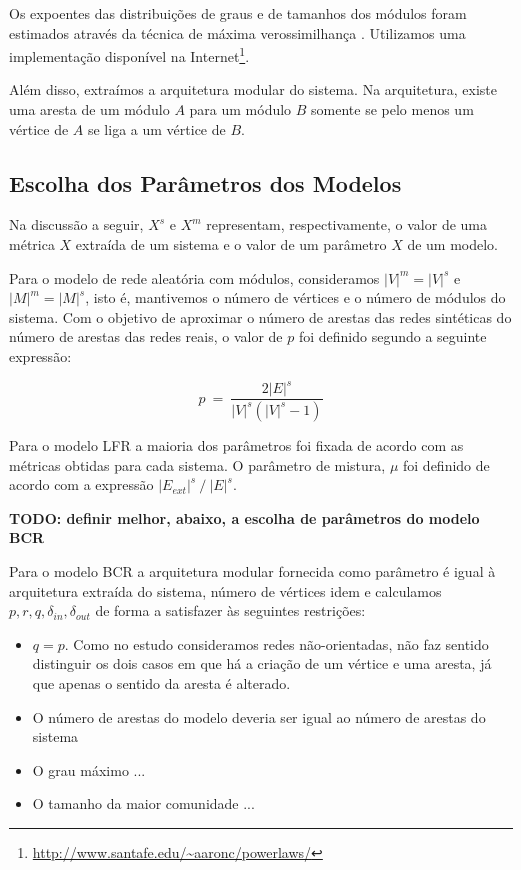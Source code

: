 \documentclass{acm_proc_article-sp}
\begin{document}
Os expoentes das distribuições de graus e de tamanhos dos módulos foram estimados através da técnica de máxima verossimilhança \cite{Clauset2007}. Utilizamos uma implementação disponível na Internet\footnote{\url{http://www.santafe.edu/~aaronc/powerlaws/}}.

Além disso, extraímos a arquitetura modular do sistema. Na arquitetura, existe uma aresta de um módulo $A$ para um módulo $B$ somente se pelo menos um vértice de $A$ se liga a um vértice de $B$.

\subsection{Escolha dos Parâmetros dos Modelos}

Na discussão a seguir, $X^s$ e $X^m$ representam, respectivamente, o valor de uma métrica $X$ extraída de um sistema e o valor de um parâmetro $X$ de um modelo.

Para o modelo de rede aleatória com módulos, consideramos $|V|^m = |V|^s$ e $|M|^m = |M|^s$, isto é,  mantivemos o número de vértices e o número de módulos do sistema. Com o objetivo de aproximar o número de arestas das redes sintéticas do número de arestas das redes reais, o valor de $p$ foi definido segundo a seguinte expressão:

\begin{equation}
p~=~\frac{2|E|^s}{|V|^s(|V|^s-1)}
\end{equation}

Para o modelo LFR a maioria dos parâmetros foi fixada de acordo com as métricas obtidas para cada sistema. O parâmetro de mistura, $\mu$ foi definido de acordo com a expressão $|E_{ext}|^s~/~|E|^s$.

\textbf{TODO: definir melhor, abaixo, a escolha de parâmetros do modelo BCR}

Para o modelo BCR a arquitetura modular fornecida como parâmetro é igual à arquitetura extraída do sistema, número de vértices idem e calculamos $p, r, q, \delta_{in}, \delta_{out}$ de forma a satisfazer às seguintes restrições:
\begin{itemize}
  \item $q = p$. Como no estudo consideramos redes não-orientadas, não faz sentido distinguir os dois casos em que há a criação de um vértice e uma aresta, já que apenas o sentido da aresta é alterado.
  \item O número de arestas do modelo deveria ser igual ao número de arestas do sistema
  \item O grau máximo ...
  \item O tamanho da maior comunidade ...
\end{itemize}
\end{document}
